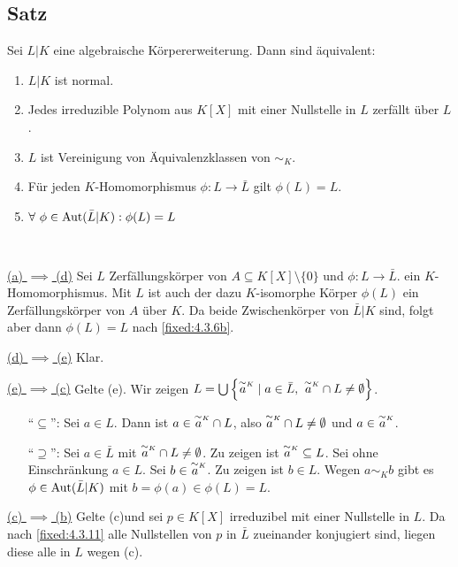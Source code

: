 \subsection{Satz} Sei $L|K$ eine algebraische Körpererweiterung. Dann sind äquivalent:
\begin{enumerate}[label=(\alph*)]
	\item
		$L|K$ ist normal.
		
	\item
		Jedes irreduzible Polynom aus $K[X]$ mit einer Nullstelle in $L$ zerfällt über $L$.
		
	\item
		$L$ ist Vereinigung von Äquivalenzklassen von $\sim_K$.
		
	\item
		Für jeden $K$-Homomorphismus $\phi: L \to \bar L$ gilt $\phi(L) = L$.
		
	\item
		$\forall~\phi \in \operatorname{Aut}(\bar L|K) : \phi(L)=L$
\end{enumerate}

\proof ~

\underline{(a) $\implies$ (d)} Sei $L$ Zerfällungskörper von $A \subseteq K[X] \setminus \{0\}$ und $\phi : L \to \bar L$. ein $K$-Homomorphismus. Mit $L$  ist auch der dazu $K$-isomorphe Körper $\phi(L)$ ein Zerfällungskörper von $A$ über $K$. Da beide Zwischenkörper von $\bar L|K$ sind, folgt aber dann $\phi(L) = L$ nach \ref{fixed:4.3.6b}.

\underline{(d) $\implies$ (e)} Klar.

\underline{(e) $\implies$ (c)} Gelte (e). Wir zeigen $L = \bigcup \left\{ \tildeidx aK \mid a \in \bar L,~\tildeidx aK \cap L \neq \emptyset \right\}$.
\begin{itemize}
	\item["`$\subseteq$"':]
		Sei $a \in L$. Dann ist $a \in \tildeidx aK \cap L$, also $\tildeidx aK \cap L \neq \emptyset$ und $a \in \tildeidx aK$.
		
	\item["`$\supseteq$"':]
		Sei $a \in \bar L$ mit $\tildeidx aK \cap L \neq \emptyset$. Zu zeigen ist $\tildeidx aK \subseteq L$. Sei ohne Einschränkung $a \in L$. Sei $b \in \tildeidx aK$. Zu zeigen ist $b \in L$. Wegen $a \sim_K b$ gibt es $\phi \in \operatorname{Aut}(\bar L|K)$ mit $b = \phi(a) \in \phi(L) = L$.
\end{itemize}

\underline{(c) $\implies$ (b)} Gelte (c)und sei $p \in K[X]$ irreduzibel mit einer Nullstelle in $L$. Da nach \ref{fixed:4.3.11} alle Nullstellen von $p$ in $\bar L$ zueinander konjugiert sind, liegen diese alle in $L$ wegen (c).

